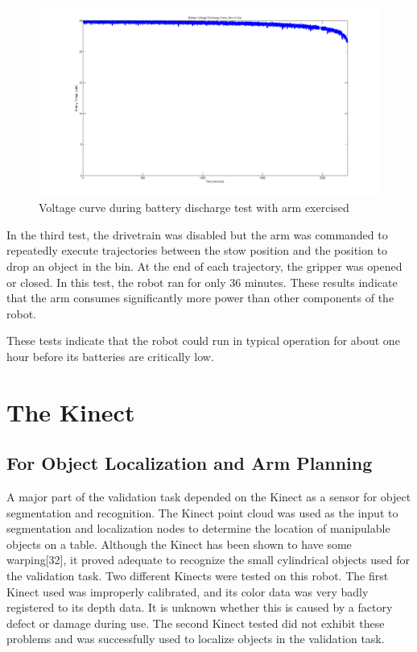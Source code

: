 \documentclass[]{cwru} %
\begin{document}
\begin{figure}[ht]
\centering
\includegraphics[width=6.0in]{discharge_arm}
\caption{Voltage curve during battery discharge test with arm exercised}
\label{fig:discharge-arm}
\end{figure}

In the third test, the drivetrain was disabled but the arm was commanded
to repeatedly execute trajectories between the stow position and the
position to drop an object in the bin. At the end of each trajectory,
the gripper was opened or closed. In this test, the robot ran for only
36 minutes. These results indicate that the arm consumes significantly
more power than other components of the robot.

These tests indicate that the robot could run in typical operation for
about one hour before its batteries are critically low.

\section{The Kinect}

\subsection{For Object Localization and Arm Planning}

A major part of the validation task depended on the Kinect as a sensor
for object segmentation and recognition. The Kinect point cloud was used
as the input to segmentation and localization nodes to determine the
location of manipulable objects on a table. Although the Kinect has been
shown to have some warping{[}32{]}, it proved adequate to recognize the
small cylindrical objects used for the validation task. Two different
Kinects were tested on this robot. The first Kinect used was improperly
calibrated, and its color data was very badly registered to its depth
data. It is unknown whether this is caused by a factory defect or damage
during use. The second Kinect tested did not exhibit these problems and
was successfully used to localize objects in the validation task.
\end{document}
